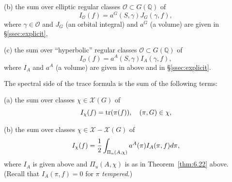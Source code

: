 (b) the sum over elliptic regular classes 
${\mathcal{O}}\subset G({\mathbb{Q}})$
of
\begin{equation}\label{eq:6.25}
I_{\mathcal{O}}(f)=
a^G(S,\gamma)J_G(\gamma,f),
\end{equation}
where $\gamma\in {\mathcal{O}}$ and
$J_G$ (an orbital integral) and $a^G$ (a volume)
are given in \S\ref{ssec:explicit},

(c) the sum over ``hyperbolic'' regular classes
${\mathcal{O}}\subset G({\mathbb{Q}})$
of
\begin{equation}\label{eq:6.26}
I_{\mathcal{O}}(f)=
a^A(S,\gamma)I_A(\gamma,f),
\end{equation}
where $I_A$ and $a^A$ (a volume)
are given in above and in \S\ref{ssec:explicit}.

The spectral side of the trace formula is the sum of the following terms:

(a) the sum over classes $\chi\in {\mathcal{X}}(G)$ of
\begin{equation}\label{eq:6.27}
I_\chi(f)=
{\rm tr}(\pi(f)),\ \ \ (\pi,G)\in\chi,
\end{equation}

(b) the sum over classes $\chi\in {\mathcal{X}}-{\mathcal{X}}(G)$ of
\begin{equation}\label{eq:6.28}
I_\chi(f)=
{1\over 2}\int_{\Pi_u(A,\chi)}
a^A(\pi)I_A(\pi,f)d\pi,
\end{equation}
where $I_A$ is given above and $\Pi_u(A,\chi)$ is as in Theorem~\ref{thm:6.22}
above. (Recall that $I_A(\pi,f)=0$ for $\pi$ {\em tempered}.)



